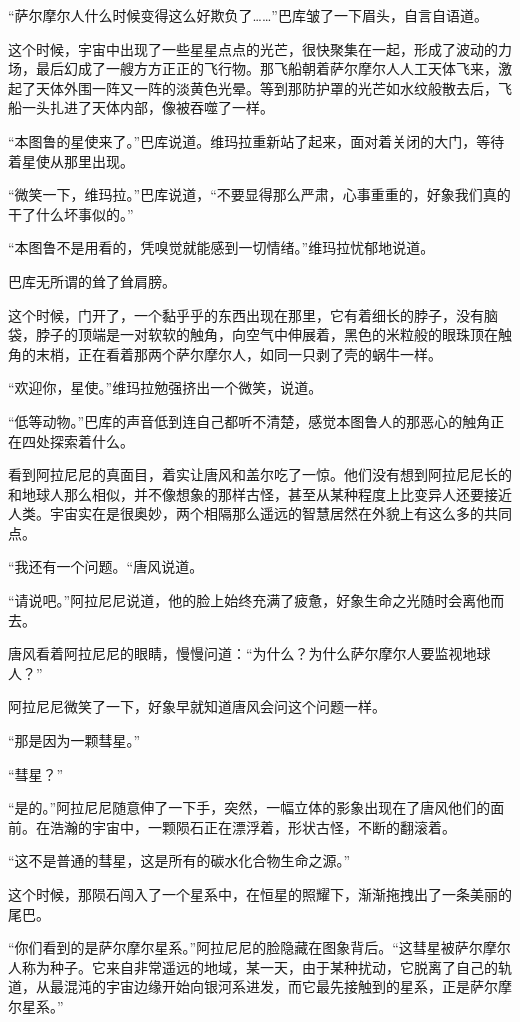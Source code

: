 “萨尔摩尔人什么时候变得这么好欺负了……”巴库皱了一下眉头，自言自语道。

这个时候，宇宙中出现了一些星星点点的光芒，很快聚集在一起，形成了波动的力场，最后幻成了一艘方方正正的飞行物。那飞船朝着萨尔摩尔人人工天体飞来，激起了天体外围一阵又一阵的淡黄色光晕。等到那防护罩的光芒如水纹般散去后，飞船一头扎进了天体内部，像被吞噬了一样。

“本图鲁的星使来了。”巴库说道。维玛拉重新站了起来，面对着关闭的大门，等待着星使从那里出现。

“微笑一下，维玛拉。”巴库说道，“不要显得那么严肃，心事重重的，好象我们真的干了什么坏事似的。”

“本图鲁不是用看的，凭嗅觉就能感到一切情绪。”维玛拉忧郁地说道。

巴库无所谓的耸了耸肩膀。

这个时候，门开了，一个黏乎乎的东西出现在那里，它有着细长的脖子，没有脑袋，脖子的顶端是一对软软的触角，向空气中伸展着，黑色的米粒般的眼珠顶在触角的末梢，正在看着那两个萨尔摩尔人，如同一只剥了壳的蜗牛一样。

“欢迎你，星使。”维玛拉勉强挤出一个微笑，说道。

“低等动物。”巴库的声音低到连自己都听不清楚，感觉本图鲁人的那恶心的触角正在四处探索着什么。

看到阿拉尼尼的真面目，着实让唐风和盖尔吃了一惊。他们没有想到阿拉尼尼长的和地球人那么相似，并不像想象的那样古怪，甚至从某种程度上比变异人还要接近人类。宇宙实在是很奥妙，两个相隔那么遥远的智慧居然在外貌上有这么多的共同点。

“我还有一个问题。“唐风说道。

“请说吧。”阿拉尼尼说道，他的脸上始终充满了疲惫，好象生命之光随时会离他而去。

唐风看着阿拉尼尼的眼睛，慢慢问道：“为什么？为什么萨尔摩尔人要监视地球人？”

阿拉尼尼微笑了一下，好象早就知道唐风会问这个问题一样。

“那是因为一颗彗星。”

“彗星？”

“是的。”阿拉尼尼随意伸了一下手，突然，一幅立体的影象出现在了唐风他们的面前。在浩瀚的宇宙中，一颗陨石正在漂浮着，形状古怪，不断的翻滚着。

“这不是普通的彗星，这是所有的碳水化合物生命之源。”

这个时候，那陨石闯入了一个星系中，在恒星的照耀下，渐渐拖拽出了一条美丽的尾巴。

“你们看到的是萨尔摩尔星系。”阿拉尼尼的脸隐藏在图象背后。“这彗星被萨尔摩尔人称为种子。它来自非常遥远的地域，某一天，由于某种扰动，它脱离了自己的轨道，从最混沌的宇宙边缘开始向银河系进发，而它最先接触到的星系，正是萨尔摩尔星系。”

